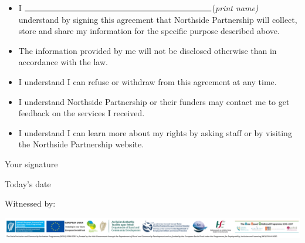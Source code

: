 \documentclass[a4paper,10pt]{article}
\begin{document}
\begin{small}
\begin{itemize}
    \item I $\rule{8cm}{0.15mm}$(\textit{print name) }understand by signing this agreement that Northside Partnership will collect, store and share my information for the specific purpose described above.
    \item The information provided by me will not be disclosed otherwise than in accordance with the law.
    \item I understand I can refuse or withdraw from this agreement at any time.
    \item I understand Northside Partnership or their funders may contact me to get feedback on the services I received.
    \item I understand I can learn more about my rights by asking staff or by visiting the Northside Partnership website. \\ 
\end{itemize}
\end{small}

\begin{minipage}{.37\textwidth}
\begin{mybox}{Your signature}
 \vspace*{0.3 cm}
\end{mybox}
\end{minipage}%
\begin{minipage}{.26\textwidth}
\begin{mybox}{Today's date}
 \vspace*{0.3 cm}
\end{mybox}
\end{minipage}%
\begin{minipage}{.37\textwidth}
\begin{mybox}{Witnessed by:}
 \vspace*{0.3 cm}
\end{mybox}
\end{minipage}%



\centering

{\includegraphics[scale = 0.061]{Footer_Banner.png}}
\end{document}
